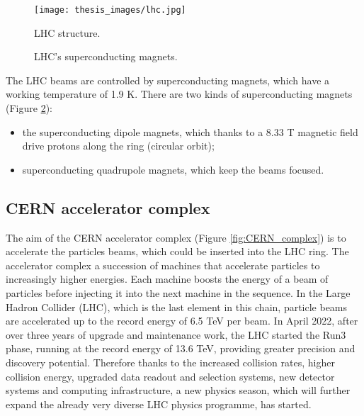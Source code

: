 \documentclass[a4paper, oneside, 11pt, openright]{book}
\begin{document}
				\begin{figure}[H]
					\centering
					\texttt{[image: thesis\_images/lhc.jpg]}
					\caption{LHC structure.}
					\label{fig:LHC_layout}
				\end{figure}
				
				\begin{figure}[H]
					\centering
					 \quad
					\caption{LHC's superconducting magnets.}
					\label{fig:magnets}
				\end{figure}
				
				The LHC beams are controlled by superconducting magnets, which have a working temperature of 1.9 K. There are two kinds of superconducting magnets (Figure \ref{fig:magnets}):
				\begin{itemize}
					\item the superconducting dipole magnets, which thanks to a 8.33 T magnetic field drive protons along the ring (circular orbit);
					\item superconducting quadrupole magnets, which keep the beams focused.
				\end{itemize} 
					
			\subsection{CERN accelerator complex}
				The aim of the CERN accelerator complex (Figure \ref{fig:CERN_complex}) is to accelerate the particles beams, which could be inserted into the LHC ring. The accelerator complex a succession of machines that accelerate particles to increasingly higher energies. Each machine boosts the energy of a beam of particles before injecting it into the next machine in the sequence. In the Large Hadron Collider (LHC), which is the last element in this chain, particle beams are accelerated up to the record energy of 6.5 TeV per beam. In April 2022, after over three years of upgrade and maintenance work, the LHC started the Run3 phase, running at the record energy of 13.6 TeV, providing greater precision and discovery potential. Therefore thanks to the increased collision rates, higher collision energy, upgraded data readout and selection systems, new detector systems and computing infrastructure, a new physics season, which will further expand the already very diverse LHC physics programme, has started.
				
\end{document}
